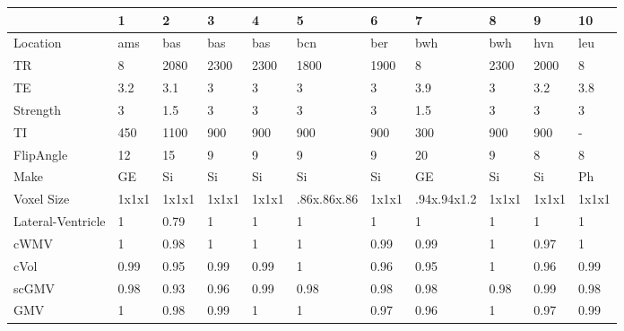 \begin{table}
[]
\centering
\begin{tabular}{lllllllllll}
\toprule
{} &     1  &     2  &     3  &     4  &                    5  &     6  &                    7  &     8  &     9  &     10 \\
\midrule
Location & ams & bas & bas & bas & bcn & ber & bwh & bwh & hvn & leu\\
\midrule
TR                            &      8 &   2080 &   2300 &   2300 &                  1800 &   1900 &                     8 &   2300 &   2000 &      8 \\
TE                            &    3.2 &    3.1 &      3 &      3 &                     3 &      3 &                   3.9 &      3 &    3.2 &    3.8 \\
Strength                      &      3 &    1.5 &      3 &      3 &                     3 &      3 &                   1.5 &      3 &      3 &      3 \\
TI                            &    450 &   1100 &    900 &    900 &                   900 &    900 &                   300 &    900 &    900 &      - \\
FlipAngle                     &     12 &     15 &      9 &      9 &                     9 &      9 &                    20 &      9 &      8 &      8 \\
Make                          &     GE &     Si &     Si &     Si &                    Si &     Si &                    GE &     Si &     Si &     Ph \\
Voxel Size                    &  1x1x1 &  1x1x1 &  1x1x1 &  1x1x1 &  .86x.86x.86 &  1x1x1 &  .94x.94x1.2 &  1x1x1 &  1x1x1 &  1x1x1 \\
\bottomrule
Lateral-Ventricle             &      1 &   0.79 &      1 &      1 &                     1 &      1 &                     1 &      1 &      1 &      1 \\
cWMV        &      1 &   0.98 &      1 &      1 &                     1 &   0.99 &                  0.99 &      1 &   0.97 &      1 \\
cVol                   &   0.99 &   0.95 &   0.99 &   0.99 &                     1 &   0.96 &                  0.95 &      1 &   0.96 &   0.99 \\
scGMV                &   0.98 &   0.93 &   0.96 &   0.99 &                  0.98 &   0.98 &                  0.98 &   0.98 &   0.99 &   0.98 \\
GMV                  &      1 &   0.98 &   0.99 &      1 &                     1 &   0.97 &                  0.96 &      1 &   0.97 &   0.99 \\

\end{tabular}
\end{table}
